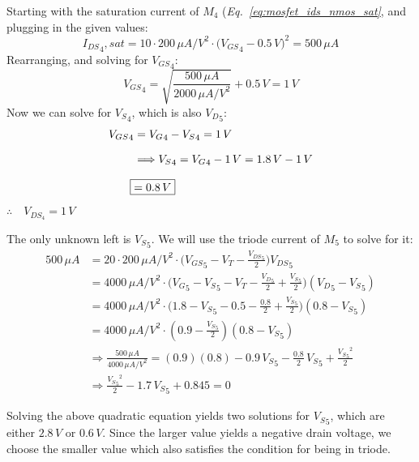 \documentclass[12pt, fleqn]{article}
\begin{document}
\begin{enumerate}[label=(\alph*)]
{\begin{enumerate}[label=(\roman*)]
{        \vspace{0.25cm}
        Starting with the saturation current of $M_4$ (\textit{Eq.~\ref{eq:mosfet_ids_nmos_sat}}, and plugging in the given values:
        \begin{equation*}
            {I_{DS}}_4,sat = 10 \cdot 200\,\mu A/V^2 \cdot {\big({V_{GS}}_4 - 0.5\,V\big)}^2 = 500\,\mu A
        \end{equation*}
        Rearranging, and solving for ${V_{GS}}_4$:
        \begin{equation*}
            {V_{GS}}_4 = \sqrt{\frac{500\,\mu A}{2000\,\mu A/V^2}} + 0.5\,V = 1\,V
        \end{equation*}
        Now we can solve for ${V_S}_4$, which is also ${V_D}_5$:
        \begin{align*}
            {V_{GS}}_4 &= {V_G}_4 - {V_S}_4 = 1\,V\\[0.25cm]
            &\Longrightarrow {V_S}_4 = {V_G}_4 - 1\,V = 1.8\,V - 1\,V\\[0.25cm]
            \Aboxed{&= 0.8\,V}
        \end{align*}
        $\boxed{\therefore\quad V_{{DS}_4} = 1\,V}$
        }
        
        \vspace{0.5cm}
        The only unknown left is ${V_S}_5$.  We will use the triode current of $M_5$ to solve for it:
        \begin{align*}
            500\,\mu A &= 20 \cdot 200\,\mu A/V^2 \cdot \big({V_{GS}}_5 - V_T - \frac{{V_{DS}}_5}{2}\big){V_{DS}}_5 \\[0.25cm]
            &= 4000\,\mu A/V^2 \cdot \big({V_G}_5 - {V_S}_5 - V_T - \frac{{V_D}_5}{2} + \frac{{V_S}_5}{2}\big)({V_D}_5 - {V_S}_5) \\[0.25cm]
            &= 4000\,\mu A/V^2 \cdot \big(1.8 - {V_S}_5 - 0.5 - \frac{0.8}{2} + \frac{{V_S}_5}{2}\big)(0.8 - {V_S}_5)\\[0.25cm]
            &= 4000\,\mu A/V^2 \cdot (0.9 - \frac{{V_S}_5}{2})(0.8 - {V_S}_5)\\[0.25cm]
            &\Longrightarrow \frac{500\,\mu A}{4000\,\mu A/V^2} = (0.9)(0.8) - 0.9\,{V_S}_5 - \frac{0.8}{2}\,{V_S}_5 + \frac{{{V_S}_5}^2}{2}\\[0.25cm]
            &\Longrightarrow \frac{{{V_S}_5}^2}{2} -1.7\,{V_S}_5 + 0.845 = 0
        \end{align*}
        
        Solving the above quadratic equation yields two solutions for ${V_S}_5$, which are either $2.8\,V$ or $0.6\,V$.  Since the larger value yields a negative drain voltage, we choose the smaller value which also satisfies the condition for being in triode.
        

\end{enumerate}}
\end{enumerate}
\end{document}
